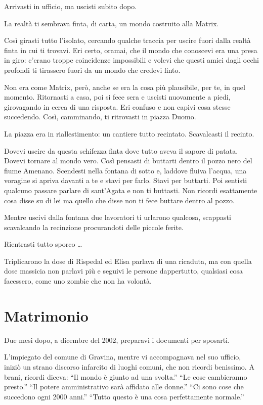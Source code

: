 Arrivasti in ufficio, ma uscisti subito dopo.

La realtà ti sembrava finta, di carta, un mondo costruito alla Matrix.

Così girasti tutto l'isolato, cercando qualche traccia per uscire fuori dalla realtà finta in cui ti trovavi. Eri certo, oramai, che il mondo che conoscevi era una presa in giro: c'erano troppe coincidenze impossibili e volevi che questi amici dagli occhi profondi ti tirassero fuori da un mondo che credevi finto.

Non era come Matrix, però, anche se era la cosa più plausibile, per te, in quel momento. Ritornasti a casa, poi si fece sera e uscisti nuovamente a piedi, girovagando in cerca di una risposta. Eri confuso e non capivi cosa stesse succedendo. Così, camminando, ti ritrovasti in piazza Duomo.

La piazza era in riallestimento: un cantiere tutto recintato. Scavalcasti il recinto.

Dovevi uscire da questa schifezza finta dove tutto aveva il sapore di patata. Dovevi tornare al mondo vero. Così pensasti di buttarti dentro il pozzo nero del fiume Amenano. Scendesti nella fontana di sotto e, laddove fluiva l'acqua, una voragine si apriva davanti a te e stavi per farlo. Stavi per buttarti. Poi sentisti qualcuno passare parlare di sant'Agata e non ti buttasti. Non ricordi esattamente cosa disse su di lei ma quello che disse non ti fece buttare dentro al pozzo.

Mentre uscivi dalla fontana due lavoratori ti urlarono qualcosa, scappasti scavalcando la recinzione procurandoti delle piccole ferite.

Rientrasti tutto sporco \ldots

Triplicarono la dose di Rispedal ed Elisa parlava di una ricaduta, ma con quella dose massicia non parlavi più e seguivi le persone dappertutto, qualsiasi cosa facessero, come uno zombie che non ha volontà.

\section{Matrimonio}
\label{matrimonio}

Due mesi dopo, a dicembre del 2002, preparavi i documenti per sposarti.

L'impiegato del comune di Gravina, mentre vi accompagnava nel suo ufficio, iniziò un strano discorso infarcito di luoghi comuni, che non ricordi benissimo. A brani, ricordi diceva: “Il mondo è giunto ad una svolta.” “Le cose cambieranno presto.” “Il potere amministrativo sarà affidato alle donne.” “Ci sono cose che succedono ogni 2000 anni.” “Tutto questo è una cosa perfettamente normale.”

